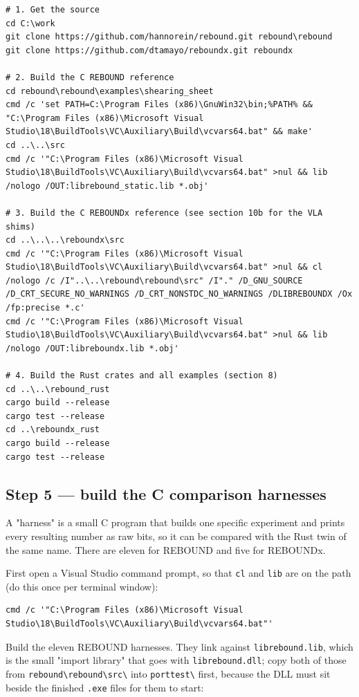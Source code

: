 \documentclass[11pt]{article}
\begin{document}
\begin{lstlisting}
# 1. Get the source
cd C:\work
git clone https://github.com/hannorein/rebound.git rebound\rebound
git clone https://github.com/dtamayo/reboundx.git reboundx

# 2. Build the C REBOUND reference
cd rebound\rebound\examples\shearing_sheet
cmd /c 'set PATH=C:\Program Files (x86)\GnuWin32\bin;%PATH% && "C:\Program Files (x86)\Microsoft Visual Studio\18\BuildTools\VC\Auxiliary\Build\vcvars64.bat" && make'
cd ..\..\src
cmd /c '"C:\Program Files (x86)\Microsoft Visual Studio\18\BuildTools\VC\Auxiliary\Build\vcvars64.bat" >nul && lib /nologo /OUT:librebound_static.lib *.obj'

# 3. Build the C REBOUNDx reference (see section 10b for the VLA shims)
cd ..\..\..\reboundx\src
cmd /c '"C:\Program Files (x86)\Microsoft Visual Studio\18\BuildTools\VC\Auxiliary\Build\vcvars64.bat" >nul && cl /nologo /c /I"..\..\rebound\rebound\src" /I"." /D_GNU_SOURCE /D_CRT_SECURE_NO_WARNINGS /D_CRT_NONSTDC_NO_WARNINGS /DLIBREBOUNDX /Ox /fp:precise *.c'
cmd /c '"C:\Program Files (x86)\Microsoft Visual Studio\18\BuildTools\VC\Auxiliary\Build\vcvars64.bat" >nul && lib /nologo /OUT:libreboundx.lib *.obj'

# 4. Build the Rust crates and all examples (section 8)
cd ..\..\rebound_rust
cargo build --release
cargo test --release
cd ..\reboundx_rust
cargo build --release
cargo test --release

\end{lstlisting}

\subsection{Step 5 --- build the C comparison harnesses}

A "harness" is a small C program that builds one specific experiment and prints every resulting number as raw bits, so it can be compared with the Rust twin of the same name. There are eleven for REBOUND and five for REBOUNDx.

First open a Visual Studio command prompt, so that \texttt{cl} and \texttt{lib} are on the path (do this once per terminal window):

\begin{lstlisting}
cmd /c '"C:\Program Files (x86)\Microsoft Visual Studio\18\BuildTools\VC\Auxiliary\Build\vcvars64.bat"'
\end{lstlisting}

Build the eleven REBOUND harnesses. They link against \texttt{librebound.lib}, which is the small "import library" that goes with \texttt{librebound.dll}; copy both of those from \texttt{rebound\textbackslash{}rebound\textbackslash{}src\textbackslash{}} into \texttt{porttest\textbackslash{}} first, because the DLL must sit beside the finished \texttt{.exe} files for them to start:
\end{document}
